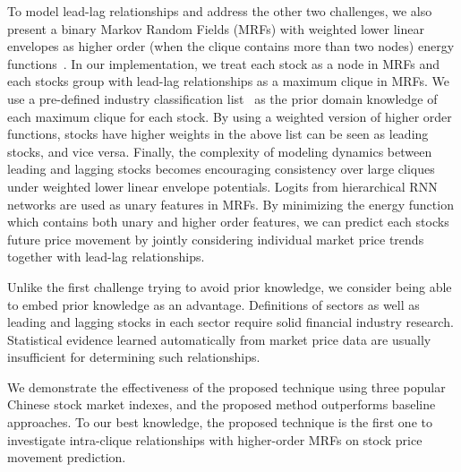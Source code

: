 To model lead-lag relationships and address the other two
challenges, we also present a binary Markov Random Fields (MRFs) with
weighted lower linear envelopes as higher order (when the clique
contains more than two nodes) energy
functions~\cite{Kohli:CVPR07,Nowozin:2011,Gould:ICML2011,gouldlearning}.
In our implementation, we treat each stock as a node in MRFs and
each stock\textquotesingle s group with lead-lag relationships as a maximum
clique in MRFs. We use a pre-defined industry classification
list~\cite{ths} as the prior domain knowledge of each
maximum clique for each stock. By using
a weighted version of higher order functions, stocks have higher
weights in the above list can be seen as leading stocks, and vice
versa. Finally, the complexity of modeling dynamics between
leading and lagging stocks becomes encouraging consistency over
large cliques under weighted lower linear envelope potentials.
Logits from hierarchical RNN networks are used as unary features
in MRFs. By minimizing the energy function which contains both
unary and higher order features, we can predict each
stock\textquotesingle s future price movement by jointly
considering individual market price trends together with
lead-lag relationships.

Unlike the first challenge trying to avoid prior knowledge,
we consider being able to embed prior knowledge as an advantage.
Definitions of sectors as well as leading and
lagging stocks in each sector require solid financial industry
research. Statistical evidence learned automatically from market
price data are usually insufficient for determining such
relationships.

We demonstrate the effectiveness of the proposed technique using
three popular Chinese stock market indexes, and the proposed
method outperforms baseline approaches. To our best
knowledge, the proposed technique is the first one to investigate
intra-clique relationships with higher-order MRFs on stock price movement
prediction.
  

